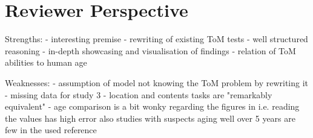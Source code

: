 \section{Reviewer Perspective}
Strengths:
- interesting premise
- rewriting of existing ToM tests
- well structured reasoning
- in-depth showcasing and visualisation of findings
- relation of ToM abilities to human age

Weaknesses:
- assumption of model not knowing the ToM problem by rewriting it
- missing data for study 3
- location and contents tasks are "remarkably equivalent"\cite{tom_children_2001, p. 665}
- age comparison is a bit wonky regarding the figures in \cite{tom_children_2001, p. 665} i.e. reading the values has high error also studies with suspects aging well over 5 years are few in the used reference